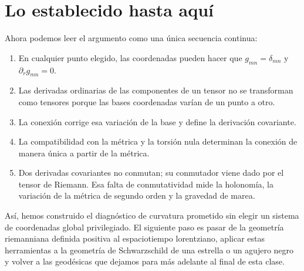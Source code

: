\section{Lo establecido hasta aquí}

Ahora podemos leer el argumento como una única secuencia continua:
\begin{enumerate}
 \item En cualquier punto elegido, las coordenadas pueden hacer que
 \(g_{mn}=\delta_{mn}\) y \(\partial_rg_{mn}=0\).
 \item Las derivadas ordinarias de las componentes de un tensor no se transforman como tensores porque las bases coordenadas varían de un punto a otro.
 \item La conexión corrige esa variación de la base y define la derivación covariante.
 \item La compatibilidad con la métrica y la torsión nula determinan la conexión de manera única a partir de la métrica.
 \item Dos derivadas covariantes no conmutan; su conmutador viene dado por el tensor de Riemann. Esa falta de conmutatividad mide la holonomía, la variación de la métrica de segundo orden y la gravedad de marea.
\end{enumerate}

Así, hemos construido el diagnóstico de curvatura prometido sin elegir un sistema de coordenadas global privilegiado. El siguiente paso es pasar de la geometría riemanniana definida positiva al espaciotiempo lorentziano, aplicar estas herramientas a la geometría de Schwarzschild de una estrella o un agujero negro y volver a las geodésicas que dejamos para más adelante al final de esta clase.